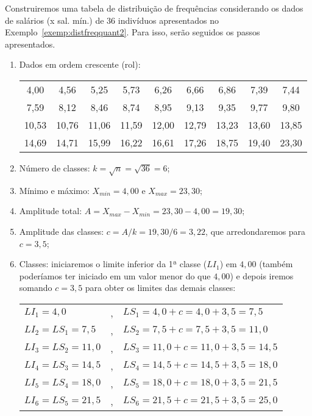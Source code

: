 \documentclass[11pt,fleqn]{book} %
\begin{document}
\begin{example} \label{exemp:distfreqquant3}

Construiremos uma tabela de distribuição de frequências considerando os dados de salários (x sal. mín.) de 36 indivíduos apresentados no Exemplo~\ref{exemp:distfreqquant2}. Para isso, serão seguidos os passos apresentados. \\

\begin{enumerate}
\item Dados em ordem crescente (rol):

	\begin{center}
	\begin{tabular}{c c c c c c c c c}
	\hline
	4,00  &  4,56  &  5,25  &  5,73  &  6,26  &  6,66	&	6,86  &  7,39  &  7,44 \\
	7,59  &  8,12  &  8,46	&	8,74  &  8,95  &  9,13  &  9,35  &  9,77  &  9,80 \\
	10,53  &  10,76  &  11,06  &	11,59  &  12,00  &  12,79	&	13,23	&  13,60  &  13,85  \\
	14,69  &  14,71  &  15,99	&	16,22  &  16,61  &  17,26	&  18,75	&  19,40  &  23,30 \\
	\hline
	\end{tabular}
	\end{center}
	
	\item Número de classes: $k=\sqrt{n}=\sqrt{36}=6$; \\
	
	\item Mínimo e máximo: $X_{min}=4,00$ e $X_{max}=23,30$; \\
	
	\item Amplitude total: $A=X_{max}-X_{min}=23,30-4,00=19,30$; \\
	
	\item Amplitude das classes: $c= A/k=19,30/6=3,22$, que arredondaremos para  $c=3,5$; \\
	
	\item Classes: iniciaremos o limite inferior da 1ª classe ($LI_1$) em $4,00$ (também poderíamos ter iniciado em um valor menor do que $4,00$) e depois iremos somando $c=3,5$ para obter os	limites das demais classes:
	

	\begin{center}
	\begin{tabular}{l l l}
	$LI_1=4,0$       & , & $LS_1=4,0+c=4,0+3,5=7,5$ \\	
	$LI_2=LS_1=7,5$  & , & $LS_2=7,5+c=7,5+3,5=11,0$ \\	
	$LI_3=LS_2=11,0$ & , & $LS_3=11,0+c=11,0+3,5=14,5$ \\	
	$LI_4=LS_3=14,5$ & , & $LS_4=14,5+c=14,5+3,5=18,0$ \\	
	$LI_5=LS_4=18,0$ & , & $LS_5=18,0+c=18,0+3,5=21,5$ \\	
	$LI_6=LS_5=21,5$ & , & $LS_6=21,5+c=21,5+3,5=25,0$ \\	
	\end{tabular}
	\end{center}
	

\end{enumerate}
\end{example}
\end{document}

